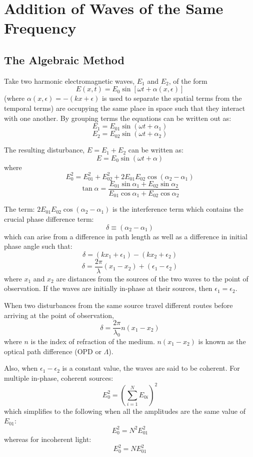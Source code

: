 \documentclass[12pt]{report}
\begin{document}
\section{Addition of Waves of the Same Frequency}

\subsection{The Algebraic Method}

Take two harmonic electromagnetic waves, $E_1$ and $E_2$, of the form \[E(x,t) = E_0 \sin [ \omega t + \alpha(x,\epsilon)]\]  (where $\alpha(x,\epsilon) = -(kx+\epsilon)$ is used to separate the spatial terms from the temporal terms) are occupying the same place in space such that they interact with one another. By grouping terms the equations can be written out as: 
\[E_1 = E_{01} \sin (\omega t + \alpha_1 )\] \[E_2 = E_{02} \sin (\omega t + \alpha_2 )\]

The resulting disturbance, $E = E_1+E_2$ can be written as:
\begin{equation}
E = E_0 \sin (\omega t + \alpha)
\end{equation}
where
\begin{equation}
E_0 ^2 = E_{01} ^2 + E_{02} ^2 + 2E_{01}E_{02} \cos (\alpha_2 - \alpha_1)
\end{equation}
\begin{equation}
\tan \alpha = \frac{E_{01} \sin \alpha_1 + E_{02} \sin \alpha_2}{E_{01} \cos \alpha_1 + E_{02} \cos \alpha_2}
\end{equation}

The term: $2E_{01}E_{02} \cos (\alpha_2 - \alpha_1)$ is the interference term which contains the crucial phase difference term: \[\delta \equiv (\alpha_2-\alpha_1)\] which can arise from a difference in path length as well as a difference in initial phase angle such that:
\[\delta = (kx_1+\epsilon_1) - (kx_2+\epsilon_2)\]
\[\delta = \frac{2\pi}{\lambda}(x_1-x_2)+(\epsilon_1-\epsilon_2)\]
where $x_1$ and $x_2$ are distances from the sources of the two waves to the point of observation. If the waves are initially in-phase at their sources, then $\epsilon_1 = \epsilon_2$.

When two disturbances from the same source travel different routes before arriving at the point of observation, \[\delta = \frac{2\pi}{\lambda_0}n(x_1-x_2)\] where $n$ is the index of refraction of the medium. $n(x_1-x_2)$ is known as the optical path difference (OPD or $\Lambda$).

Also, when $\epsilon_1-\epsilon_2$ is a constant value, the waves are said to be coherent. For multiple in-phase, coherent sources: \[E_0 ^2 = \left( \displaystyle\sum\limits_{i=1}^N E_{0i} \right)^2 \] which simplifies to the following when all the amplitudes are the same value of $E_{01}$:
\[E_0 ^2 = N^2 E_{01}^2\] whereas for incoherent light: \[E_0 ^2 = N E_{01}^2\]
\end{document}
